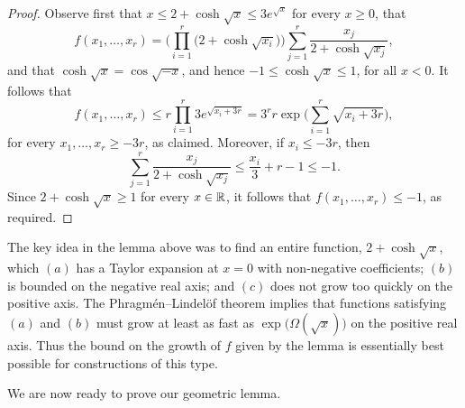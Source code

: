 \begin{proof}
Observe first that $x \le 2 + \cosh\sqrt{x} \le 3e^{\sqrt{x}}$ for every $x \ge 0$, 
that 
$$f(x_1,\dots,x_r) = \bigg( \prod_{i = 1}^r \big( 2 + \cosh \sqrt{x_i} \big) \bigg) \sum_{j = 1}^r \frac{x_j}{2+\cosh\sqrt{x_j}},$$
and that $\cosh \sqrt{x} = \cos \sqrt{-x}$, and hence $-1 \le \cosh \sqrt{x} \le 1$, for all $x < 0$. It follows that
$$f(x_1,\dots,x_r)\le r \prod_{i=1}^r 3e^{\sqrt{x_i + 3r}} =3^r r \exp\bigg(\sum_{i=1}^r \sqrt{x_i + 3r} \bigg),$$
for every $x_1,\ldots,x_r \ge -3r$, as claimed. Moreover, if $x_i \le -3r$, then
$$\sum_{j = 1}^r \frac{x_j}{2+\cosh\sqrt{x_j}} \le \frac{x_i}{3} + r - 1 \le - 1.$$
Since $2 + \cosh \sqrt{x} \ge 1$ for every $x \in \mathbb{R}$, it follows that $f(x_1,\dots,x_r) \le -1$, as required. 
\end{proof}

\pagebreak

\begin{remark}
The key idea in the lemma above was to find an entire function, $2 + \cosh\sqrt{x}$, which $(a)$ has a Taylor expansion at $x = 0$ with non-negative coefficients; $(b)$ is bounded on the negative real axis; and $(c)$ does not grow too quickly on the positive axis. The Phragm\'en--Lindel\"of theorem %
implies that functions satisfying $(a)$ and $(b)$ must grow at least as fast as $\exp\big( \Omega(\sqrt{x}) \big)$ on the positive real axis.  Thus the bound on the growth of $f$ given by the lemma is essentially best possible for constructions of this type.
\end{remark}

We are now ready to prove our geometric lemma. 

